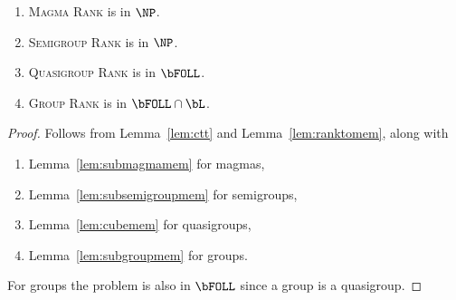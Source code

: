 
\begin{theorem}\label{thm:rank}
  \mbox{}
  \begin{enumerate}
  \item \textsc{Magma Rank} is in $\NP$.
  \item \textsc{Semigroup Rank} is in $\NP$.
  \item \textsc{Quasigroup Rank} is in $\bFOLL$.
  \item \textsc{Group Rank} is in $\bFOLL \cap \bL$.
  \end{enumerate}
\end{theorem}
\begin{proof}
  Follows from Lemma~\ref{lem:ctt} and Lemma~\ref{lem:ranktomem}, along with
  \begin{enumerate}
  \item Lemma~\ref{lem:submagmamem} for magmas,
  \item Lemma~\ref{lem:subsemigroupmem} for semigroups,
  \item Lemma~\ref{lem:cubemem} for quasigroups,
  \item Lemma~\ref{lem:subgroupmem} for groups.
  \end{enumerate}
  For groups the problem is also in $\bFOLL$ since a group is a quasigroup.
\end{proof}



